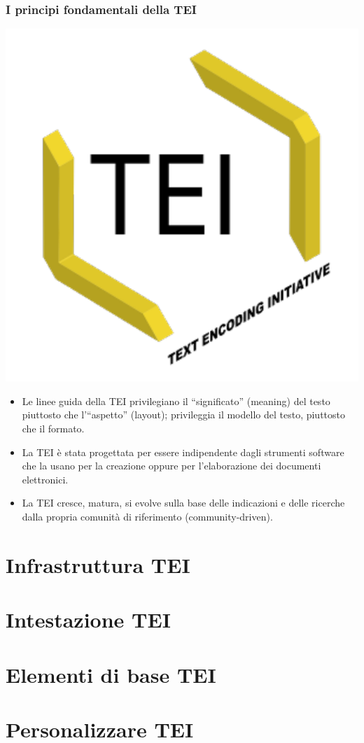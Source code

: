 \documentclass{beamer}
\begin{document}
\begin{frame}
	\frametitle{I principi fondamentali della TEI}
	\addtocounter{nframe}{1}
    
    \begin{center}
	    \includegraphics[width=.2\textwidth]{../imgs/tei-r.pdf}
	\end{center}

    \begin{itemize}
        
        \item<1-> Le linee guida della TEI privilegiano il ``significato'' (meaning) del testo piuttosto che l'``aspetto'' (layout); privileggia il modello del testo, piuttosto che il formato.
          
        \item<2-> La TEI è stata progettata per essere indipendente dagli strumenti software che la usano per la creazione oppure per l'elaborazione dei documenti elettronici.

        \item<3-> La TEI cresce, matura, si evolve sulla base delle indicazioni e delle ricerche dalla propria comunità di riferimento (community-driven).
           
    \end{itemize}
    
\end{frame}

\section{Infrastruttura TEI}


\section{Intestazione TEI}


\section{Elementi di base TEI}


\section{Personalizzare TEI}


%
\end{document}
